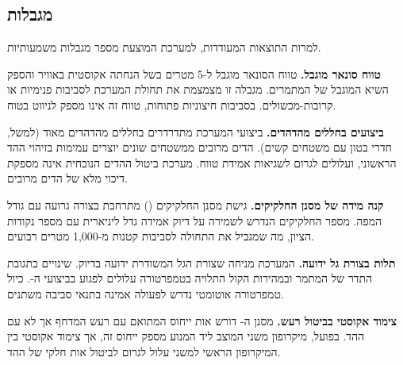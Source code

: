 \subsection{מגבלות}
\label{sec:ch09_limitations}

למרות התוצאות המעודדות, למערכת המוצעת מספר מגבלות משמעותיות.

\textbf{טווח סונאר מוגבל.} טווח הסונאר מוגבל ל-5 מטרים בשל הנחתה אקוסטית באוויר והספק השיא המוגבל של המתמרים. מגבלה זו מצמצמת את תחולת המערכת לסביבות פנימיות או קרובות-מכשולים. בסביבות חיצוניות פתוחות, טווח זה אינו מספק לניווט בטוח.

\textbf{ביצועים בחללים מהדהדים.} ביצועי המערכת מתדרדרים בחללים מהדהדים מאוד (למשל, חדרי בטון עם משטחים קשים). הדים מרובים ממשטחים שונים יוצרים עמימות בזיהוי ההד הראשוני, ועלולים לגרום לשגיאות אמידת טווח. מערכת ביטול ההדים הנוכחית אינה מספקת דיכוי מלא של הדים מרובים.

\textbf{קנה מידה של מסנן החלקיקים.} גישת מסנן החלקיקים () מתרחבת בצורה גרועה עם גודל המפה. מספר החלקיקים הנדרש לשמירה על דיוק אמידה גדל ליניארית עם מספר נקודות הציון, מה שמגביל את התחולה לסביבות קטנות מ-1,000 מטרים רבועים.

\textbf{תלות בצורת גל ידועה.} המערכת מניחה שצורת הגל המשודרת ידועה בדיוק. שינויים בתגובת התדר של המתמר ובמהירות הקול התלויה בטמפרטורה עלולים לפגוע בביצועי ה-. כיול טמפרטורה אוטומטי נדרש לפעולה אמינה בתנאי סביבה משתנים.

\textbf{צימוד אקוסטי בביטול רעש.} מסנן ה- דורש אות ייחוס המתואם עם רעש המדחף אך לא עם ההד. בפועל, מיקרופון משני המוצב ליד המנוע מספק ייחוס זה, אך צימוד אקוסטי בין המיקרופון הראשי למשני עלול לגרום לביטול אות חלקי של ההד.

\begin{table}[htbp]
\centering
\caption{סיכום מגבלות המערכת ופתרונות עתידיים מוצעים. (Summary of system limitations and proposed future solutions.)}
\label{tab:ch09_limitations}
\end{table}

